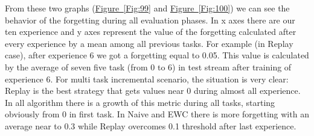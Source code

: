 \documentclass[english, LaM, oneside]{sapthesis}%
\begin{document}
From these two graphs (\hyperref[Fig:99]{Figure~\ref*{Fig:99}} and \hyperref[Fig:100]{Figure~\ref*{Fig:100}}) we can see the behavior of the forgetting during all evaluation phases. 
In x axes there are our ten experience and y axes represent the value of the forgetting calculated after every experience by a mean among all previous tasks. 
For example (in Replay case), after experience 6 we got a forgetting equal to 0.05. This value is calculated by the average of seven five task (from 0 to 6) in test stream after training of experience 6. 
For multi task incremental scenario, the situation is very clear: Replay is the best strategy that gets values near 0 during almost all experience. In all algorithm there is a growth of this metric during all tasks, starting obviously from 0 in first task. In Naive and EWC there is more forgetting with an average near to 0.3 while Replay overcomes 0.1 threshold after last experience.
\end{document}
